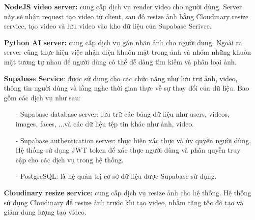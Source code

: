 \textbf{NodeJS video server:} cung cấp dịch vụ render video cho người dùng. Server này sẽ nhận request tạo video từ client, sau đó resize ảnh bằng Cloudinary resize service, tạo video và lưu video vào kho dữ liệu của Supabase Serivce. 

\textbf{Python AI server:} cung cấp dịch vụ gán nhãn ảnh cho người dung. Ngoài ra server cũng thực hiện việc nhận diện khuôn mặt trong ảnh và nhóm những khuôn mặt tương tự nhau để người dùng có thể dễ dàng tìm kiếm và phân loại ảnh. 

\textbf{Supabase Service}: được sử dụng cho các chức năng như lưu trữ ảnh, video, thông tin người dùng và lắng nghe thời gian thực về sự thay đổi của dữ liệu. Bao gồm các dịch vụ như sau:
\begin{itemize}
    \item[-] Supabase database server: lưu trữ các bảng dữ liệu như users, videos, images, faces, ...và các dữ liệu tệp tin khác như ảnh, video.
    \item[-] Supabase authentication server: thực hiện xác thực và ủy quyền người dùng. Hệ thống sử dụng JWT token để xác thực người dùng và phân quyền truy cập cho các dịch vụ trong hệ thống.
    \item[-] PostgreSQL: là hệ quản trị cơ sở dữ liệu được Supabase sử dụng.  
\end{itemize}

\textbf{Cloudinary resize service}: cung cấp dịch vụ resize ảnh cho hệ thống. Hệ thống sử dụng Cloudinary để resize ảnh trước khi tạo video, nhằm tăng tốc độ tạo và giảm dung lượng tạo video.
